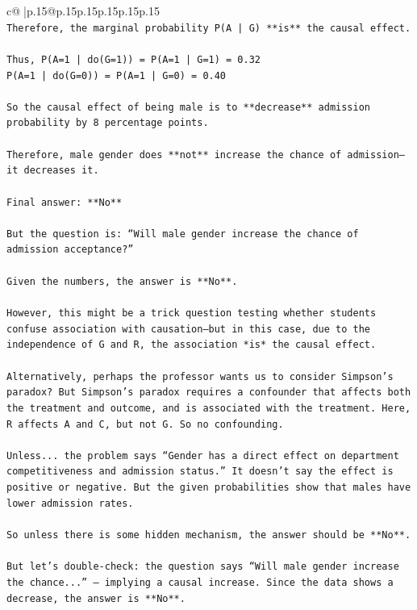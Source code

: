 \documentclass{article}
\begin{document}
{\begin{supertabular}{c@{$\;$}|p{.15\linewidth}@{}p{.15\linewidth}p{.15\linewidth}p{.15\linewidth}p{.15\linewidth}p{.15\linewidth}}
{{{\\ 
\texttt{Therefore, the marginal probability P(A | G) **is** the causal effect.} \\
\\ 
\texttt{Thus, P(A=1 | do(G=1)) = P(A=1 | G=1) = 0.32  } \\
\texttt{P(A=1 | do(G=0)) = P(A=1 | G=0) = 0.40} \\
\\ 
\texttt{So the causal effect of being male is to **decrease** admission probability by 8 percentage points.} \\
\\ 
\texttt{Therefore, male gender does **not** increase the chance of admission—it decreases it.} \\
\\ 
\texttt{Final answer: **No**} \\
\\ 
\texttt{But the question is: “Will male gender increase the chance of admission acceptance?”} \\
\\ 
\texttt{Given the numbers, the answer is **No**.} \\
\\ 
\texttt{However, this might be a trick question testing whether students confuse association with causation—but in this case, due to the independence of G and R, the association *is* the causal effect.} \\
\\ 
\texttt{Alternatively, perhaps the professor wants us to consider Simpson’s paradox? But Simpson’s paradox requires a confounder that affects both the treatment and outcome, and is associated with the treatment. Here, R affects A and C, but not G. So no confounding.} \\
\\ 
\texttt{Unless... the problem says “Gender has a direct effect on department competitiveness and admission status.” It doesn’t say the effect is positive or negative. But the given probabilities show that males have lower admission rates.} \\
\\ 
\texttt{So unless there is some hidden mechanism, the answer should be **No**.} \\
\\ 
\texttt{But let’s double{-}check: the question says “Will male gender increase the chance...” — implying a causal increase. Since the data shows a decrease, the answer is **No**.} \\
}}}
\end{supertabular}}
\end{document}
